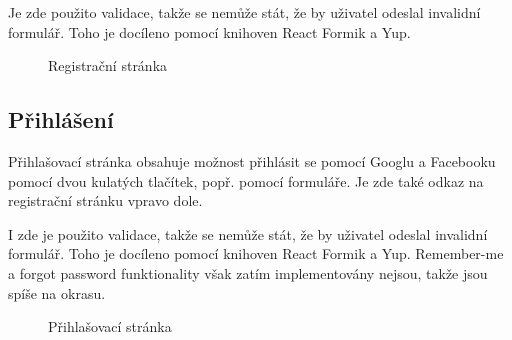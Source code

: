\documentclass[a4paper,oneside,12pt]{report}
\begin{document}
Je zde použito validace, takže se nemůže stát, že by uživatel odeslal invalidní formulář. Toho je docíleno pomocí knihoven React Formik a Yup.
\begin{figure}[H]
   \centering
   \caption[Registrační stránka]{Registrační stránka}
   \label{fig:architecture}
\end{figure}

\subsection{Přihlášení}
Přihlašovací stránka obsahuje možnost přihlásit se pomocí Googlu a Facebooku pomocí dvou kulatých tlačítek, popř. pomocí formuláře. Je zde také odkaz na registrační stránku vpravo dole.

I zde je použito validace, takže se nemůže stát, že by uživatel odeslal invalidní formulář. Toho je docíleno pomocí knihoven React Formik a Yup. Remember-me a forgot password funktionality však zatím implementovány nejsou, takže jsou spíše na okrasu.
\begin{figure}[H]
   \centering
   \caption[Přihlašovací stránka]{Přihlašovací stránka}
   \label{fig:architecture}
\end{figure}
\end{document}
